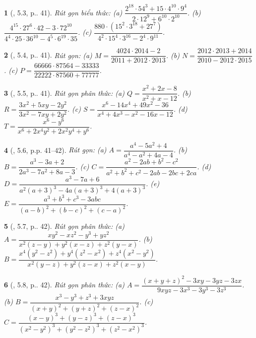 \documentclass{article}
\newtheorem{baitoan}{}
\begin{document}
\begin{baitoan}[\cite{TLCT_THCS_Toan_8_dai_so}, 5.3, p.. 41]
	Rút gọn biểu thức: (a) $\dfrac{2^{18}\cdot 54^3 + 15\cdot 4^{10}\cdot 9^4}{2\cdot 12^9 + 6^{10}\cdot 2^{10}}$. (b) $\dfrac{4^{15}\cdot 27^6\cdot 42 - 3\cdot 72^{10}}{4^4\cdot 25\cdot 36^{10}  - 4^5\cdot 6^{19}\cdot 35}$. (c) $\dfrac{880\cdot(15^2\cdot 3^{18} + 27^7)}{4^2\cdot 15^4\cdot 3^{16} - 2^4\cdot 9^{11}}$.
\end{baitoan}

\begin{baitoan}[\cite{TLCT_THCS_Toan_8_dai_so}, 5.4, p.. 41]
	Rút gọn: (a) $M = \dfrac{4024\cdot 2014 - 2}{2011 + 2012\cdot 2013}$. (b) $N = \dfrac{2012\cdot 2013 + 2014}{2010 - 2012\cdot 2015}$. (c) $P = \dfrac{66666\cdot 87564 - 33333}{22222\cdot 87560 + 77777}$.
\end{baitoan}

\begin{baitoan}[\cite{TLCT_THCS_Toan_8_dai_so}, 5.5, p.. 41]
	Rút gọn phân thức: (a) $Q = \dfrac{x^2 + 2x - 8}{x^2 + x - 12}$. (b) $R = \dfrac{3x^2 + 5xy - 2y^2}{3x^2 - 7xy + 2y^2}$. (c) $S = \dfrac{x^6 - 14x^4 + 49x^2 - 36}{x^4 + 4x^3 - x^2 - 16x - 12}$. (d) $T = \dfrac{x^6 - y^6}{x^6 + 2x^4y^2 + 2x^2y^4 + y^6}$.	
\end{baitoan}

\begin{baitoan}[\cite{TLCT_THCS_Toan_8_dai_so}, 5.6, p.p. 41--42]
	Rút gọn: (a) $A = \dfrac{a^4 - 5a^2 + 4}{a^4 - a^2 + 4a - 4}$. (b) $B = \dfrac{a^3 - 3a + 2}{2a^3 - 7a^2 + 8a - 3}$. (c) $C = \dfrac{a^2 - 2ab + b^2 - c^2}{a^2 + b^2 + c^2 - 2ab - 2bc + 2ca}$. (d) $D = \dfrac{a^3 - 7a + 6}{a^2(a + 3)^3 - 4a(a + 3)^3 + 4(a + 3)^3}$. (e) $E = \dfrac{a^3 + b^3 + c^3 - 3abc}{(a - b)^2 + (b - c)^2 + (c - a)^2}$.	
\end{baitoan}

\begin{baitoan}[\cite{TLCT_THCS_Toan_8_dai_so}, 5.7, p.. 42]
	Rút gọn phân thức: (a) $A = \dfrac{xy^2 - xz^2 - y^3 + yz^2}{x^2(z - y) + y^2(x - z) + z^2(y - x)}$. (b) $B = \dfrac{x^4(y^2 - z^2) + y^4(z^2 - x^2) + z^4(x^2 - y^2)}{x^2(y - z) + y^2(z - x) + z^2(x - y)}$.	
\end{baitoan}

\begin{baitoan}[\cite{TLCT_THCS_Toan_8_dai_so}, 5.8, p.. 42]
	Rút gọn phân thức: (a) $A = \dfrac{(x + y + z)^2 - 3xy - 3yz - 3zx}{9xyz - 3x^3 - 3y^3 - 3z^3}$. (b) $B = \dfrac{x^3 - y^3 + z^3 + 3xyz}{(x + y)^2 + (y + z)^2 + (z - x)^2}$. (c) $C = \dfrac{(x - y)^3 + (y - z)^3 + (z - x)^3}{(x^2 - y^2)^3 + (y^2 - z^2)^3 + (z^2 - x^2)^3}$.	
\end{baitoan}
\end{document}
